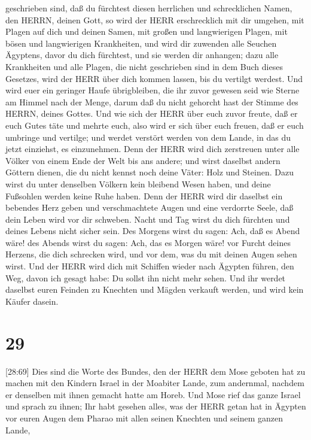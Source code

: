 geschrieben sind, daß du fürchtest diesen herrlichen und schrecklichen
Namen, den HERRN, deinen Gott,  so wird der HERR
erschrecklich mit dir umgehen, mit Plagen auf dich und deinen Samen, mit
großen und langwierigen Plagen, mit bösen und langwierigen Krankheiten,
 und wird dir zuwenden alle Seuchen Ägyptens, davor du dich
fürchtest, und sie werden dir anhangen;  dazu alle
Krankheiten und alle Plagen, die nicht geschrieben sind in dem Buch
dieses Gesetzes, wird der HERR über dich kommen lassen, bis du vertilgt
werdest.  Und wird euer ein geringer Haufe übrigbleiben,
die ihr zuvor gewesen seid wie Sterne am Himmel nach der Menge, darum
daß du nicht gehorcht hast der Stimme des HERRN, deines Gottes.
 Und wie sich der HERR über euch zuvor freute, daß er euch
Gutes täte und mehrte euch, also wird er sich über euch freuen, daß er
euch umbringe und vertilge; und werdet verstört werden von dem Lande, in
das du jetzt einziehst, es einzunehmen.  Denn der HERR wird
dich zerstreuen unter alle Völker von einem Ende der Welt bis ans
andere; und wirst daselbst andern Göttern dienen, die du nicht kennst
noch deine Väter: Holz und Steinen.  Dazu wirst du unter
denselben Völkern kein bleibend Wesen haben, und deine Fußsohlen werden
keine Ruhe haben. Denn der HERR wird dir daselbst ein bebendes Herz
geben und verschmachtete Augen und eine verdorrte Seele, 
daß dein Leben wird vor dir schweben. Nacht und Tag wirst du dich
fürchten und deines Lebens nicht sicher sein.  Des Morgens
wirst du sagen: Ach, daß es Abend wäre! des Abends wirst du sagen: Ach,
das es Morgen wäre! vor Furcht deines Herzens, die dich schrecken wird,
und vor dem, was du mit deinen Augen sehen wirst.  Und der
HERR wird dich mit Schiffen wieder nach Ägypten führen, den Weg, davon
ich gesagt habe: Du sollst ihn nicht mehr sehen. Und ihr werdet daselbst
euren Feinden zu Knechten und Mägden verkauft werden, und wird kein
Käufer dasein.

\hypertarget{section-28}{%
\section{29}\label{section-28}}

 {[}28:69{]} Dies sind die Worte des Bundes, den der HERR
dem Mose geboten hat zu machen mit den Kindern Israel in der Moabiter
Lande, zum andernmal, nachdem er denselben mit ihnen gemacht hatte am
Horeb.  Und Mose rief das ganze Israel und sprach zu ihnen;
Ihr habt gesehen alles, was der HERR getan hat in Ägypten vor euren
Augen dem Pharao mit allen seinen Knechten und seinem ganzen Lande,

